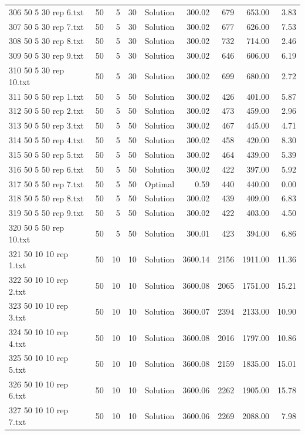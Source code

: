 \begin{longtable}{lrrllrrrr}
306 50 5 30 rep 6.txt & 50 & 5 & 30 & Solution & 300.02 & 679 & 653.00 &  3.83\\
307 50 5 30 rep 7.txt & 50 & 5 & 30 & Solution & 300.02 & 677 & 626.00 &  7.53\\
308 50 5 30 rep 8.txt & 50 & 5 & 30 & Solution & 300.02 & 732 & 714.00 &  2.46\\
309 50 5 30 rep 9.txt & 50 & 5 & 30 & Solution & 300.02 & 646 & 606.00 &  6.19\\
310 50 5 30 rep 10.txt & 50 & 5 & 30 & Solution & 300.02 & 699 & 680.00 &  2.72\\
311 50 5 50 rep 1.txt & 50 & 5 & 50 & Solution & 300.02 & 426 & 401.00 &  5.87\\
312 50 5 50 rep 2.txt & 50 & 5 & 50 & Solution & 300.02 & 473 & 459.00 &  2.96\\
313 50 5 50 rep 3.txt & 50 & 5 & 50 & Solution & 300.02 & 467 & 445.00 &  4.71\\
314 50 5 50 rep 4.txt & 50 & 5 & 50 & Solution & 300.02 & 458 & 420.00 &  8.30\\
315 50 5 50 rep 5.txt & 50 & 5 & 50 & Solution & 300.02 & 464 & 439.00 &  5.39\\
316 50 5 50 rep 6.txt & 50 & 5 & 50 & Solution & 300.02 & 422 & 397.00 &  5.92\\
317 50 5 50 rep 7.txt & 50 & 5 & 50 & Optimal &  0.59 & 440 & 440.00 &  0.00\\
318 50 5 50 rep 8.txt & 50 & 5 & 50 & Solution & 300.02 & 439 & 409.00 &  6.83\\
319 50 5 50 rep 9.txt & 50 & 5 & 50 & Solution & 300.02 & 422 & 403.00 &  4.50\\
320 50 5 50 rep 10.txt & 50 & 5 & 50 & Solution & 300.01 & 423 & 394.00 &  6.86\\
321 50 10 10 rep 1.txt & 50 & 10 & 10 & Solution & 3600.14 & 2156 & 1911.00 & 11.36\\
322 50 10 10 rep 2.txt & 50 & 10 & 10 & Solution & 3600.08 & 2065 & 1751.00 & 15.21\\
323 50 10 10 rep 3.txt & 50 & 10 & 10 & Solution & 3600.07 & 2394 & 2133.00 & 10.90\\
324 50 10 10 rep 4.txt & 50 & 10 & 10 & Solution & 3600.08 & 2016 & 1797.00 & 10.86\\
325 50 10 10 rep 5.txt & 50 & 10 & 10 & Solution & 3600.08 & 2159 & 1835.00 & 15.01\\
326 50 10 10 rep 6.txt & 50 & 10 & 10 & Solution & 3600.06 & 2262 & 1905.00 & 15.78\\
327 50 10 10 rep 7.txt & 50 & 10 & 10 & Solution & 3600.06 & 2269 & 2088.00 &  7.98\\

\end{longtable}
